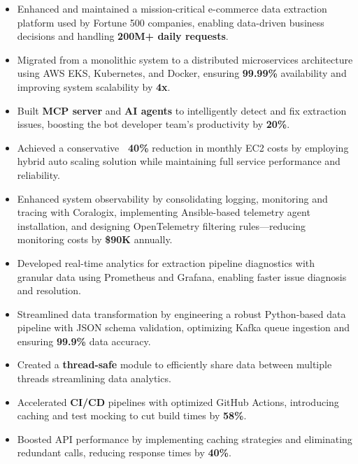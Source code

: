 \documentclass[11pt]{article}       %
\begin{document}
\begin{itemize}
  \item Enhanced and maintained a mission-critical e-commerce data extraction platform used by Fortune 500 companies, enabling data-driven business decisions and handling \textbf{200M+ daily requests}. \\
  \item Migrated from a monolithic system to a distributed microservices architecture using AWS EKS, Kubernetes, and Docker, ensuring \textbf{99.99\%} availability and improving system scalability by \textbf{4x}. \\
  \item Built \textbf{MCP server} and \textbf{AI agents} to intelligently detect and fix extraction issues, boosting the bot developer team's productivity by \textbf{20\%}. \\
  \item Achieved a conservative \textbf{~40\%} reduction in monthly EC2 costs by employing hybrid auto scaling solution while maintaining full service performance and reliability. \\
  \item Enhanced system observability by consolidating logging, monitoring and tracing with Coralogix, implementing Ansible-based telemetry agent installation, and designing OpenTelemetry filtering rules—reducing monitoring costs by \textbf{\$90K} annually. \\
  \item Developed real-time analytics for extraction pipeline diagnostics with granular data using Prometheus and Grafana, enabling faster issue diagnosis and resolution. \\
  \item Streamlined data transformation by engineering a robust Python-based data pipeline with JSON schema validation, optimizing Kafka queue ingestion and ensuring \textbf{99.9\%} data accuracy. \\
  \item Created a \textbf{thread-safe} module to efficiently share data between multiple threads streamlining data analytics. \\
  \item Accelerated \textbf{CI/CD} pipelines with optimized GitHub Actions, introducing caching and test mocking to cut build times by \textbf{58\%}. \\
  \item Boosted API performance by implementing caching strategies and eliminating redundant calls, reducing response times by \textbf{40\%}. \\
\end{itemize}
\end{document}
